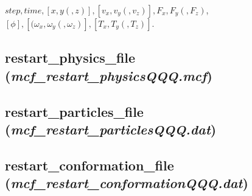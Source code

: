 \documentclass[a4paper,10pt]{article}
\begin{document}
\textbf{$step, time, [x, y(, z)], [v_x, v_y(, v_z)],
F_x, F_y(, F_z)$},
\textbf{$[\phi],[(\omega_x, \omega_y(, \omega_z)], 
[T_x, T_y(, T_z)]$}.

\subsection{\textbf{restart\_physics\_file}\\
(\textit{mcf\_restart\_physicsQQQ.mcf})}


\subsection{\textbf{restart\_particles\_file}\\
(\textit{mcf\_restart\_particlesQQQ.dat})}


\subsection{\textbf{restart\_conformation\_file}\\
(\textit{mcf\_restart\_conformationQQQ.dat})}



\end{document}
